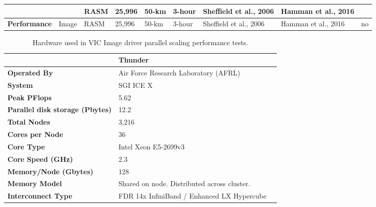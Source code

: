 \documentclass[gmd, manuscript]{copernicus}
\begin{document}
\begin{table}[]
{\begin{tabular}{|l|l|l|l|l|l|l|l|l|}
                                  &                              & RASM            & 25,996              & 50-km               & 3-hour            & Sheffield et al., 2006 & Hamman et al., 2016 &                     \\ \hline
\textbf{Performance}              & Image                        & RASM            & 25,996              & 50-km               & 3-hour            & Sheffield et al., 2006 & Hamman et al., 2016 & no                  \\ \hline
\end{tabular}
}
\end{table}

\clearpage
\begin{table}[]
\centering
\caption{Hardware used in VIC Image driver parallel scaling performance tests.}
\label{table:hardware}
  \begin{tabular}{|l|l|l|}
    \hline
    \textbf{}                                & \textbf{Thunder}                            \\ \hline
    \textbf{Operated By}                     & Air Force Research Laboratory (AFRL)        \\ \hline
    \textbf{System}                          & SGI ICE X                                   \\ \hline
    \textbf{Peak PFlops}                     & 5.62                                        \\ \hline
    \textbf{Parallel disk storage (Pbytes)}  & 12.2                                        \\ \hline
    \textbf{Total Nodes}                     & 3,216                                       \\ \hline
    \textbf{Cores per Node}                      & 36                                      \\ \hline
    \textbf{Core Type}                       & Intel Xeon E5-2699v3                        \\ \hline
    \textbf{Core Speed (GHz)}                & 2.3                                         \\ \hline
    \textbf{Memory/Node (Gbytes)}            & 128                                         \\ \hline
    \textbf{Memory Model}                    & Shared on node. Distributed across cluster. \\ \hline
    \textbf{Interconnect Type}               & FDR 14x InfiniBand / Enhanced LX Hypercube  \\ \hline
  \end{tabular}
\end{table}
\end{document}
